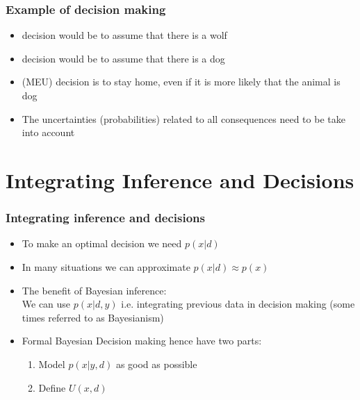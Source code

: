 \documentclass[10pt]{beamer}
\begin{document}
\begin{frame}

\frametitle{Example of decision making}

  \begin{itemize}
  \item {} decision would be to assume that there is a wolf
  \pause
  \item {} decision would be to assume that there is a dog
  \pause
  \item {} (MEU) decision is to stay home, even if it is more likely that the animal is dog
\vspace{5mm}
  \item The uncertainties (probabilities) related to all consequences need to be take into account
  \end{itemize}
\end{frame}


\section{Integrating Inference and Decisions}
\frame{\sectionpage}

\begin{frame}

\frametitle{Integrating inference and decisions}

  \begin{itemize}
    \item To make an optimal decision we need $p(x|d)$
    \pause
    \item In many situations we can approximate $p(x|d) \approx p(x)$
    \pause
    \item The benefit of Bayesian inference: \\
    We can use $p(x|d, y)$ i.e. integrating previous data in decision making (some times referred to as Bayesianism)
    \item Formal Bayesian Decision making hence have two parts:
    \begin{enumerate}
        \item Model $p(x|y,d)$ as good as possible \pause
        \item Define $U(x,d)$
    \end{enumerate}
  \end{itemize}

\end{frame}
\end{document}
